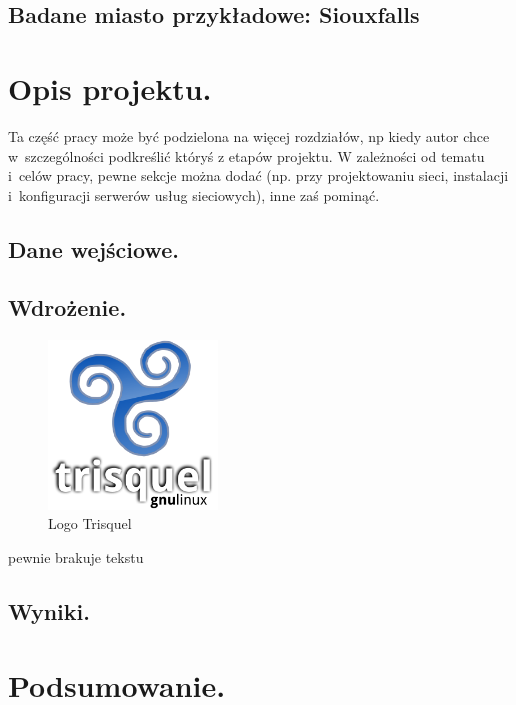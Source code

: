 \documentclass[twoside,12pt]{report}
\let\oldsection\chapter
\def\chapter{\cleardoublepage\oldsection}
\begin{document}
\section{Badane miasto przykładowe: Siouxfalls}


\chapter{Opis projektu.}\label{rozdz.opis} 
Ta część pracy może być podzielona na więcej rozdziałów, np kiedy autor chce
w~szczególności podkreślić któryś z etapów projektu. W zależności od tematu i~celów pracy, pewne sekcje można dodać (np. przy projektowaniu sieci, instalacji
i~konfiguracji serwerów usług sieciowych), inne zaś pominąć.

\section{Dane wejściowe.}





\section{Wdrożenie.}

\begin{figure}[ht]
\includegraphics[width=0.4\textwidth]{img/trisquel}
\caption{Logo Trisquel\cite{trisquel}}
\end{figure}

pewnie brakuje tekstu

\section{Wyniki.}


\chapter{Podsumowanie.}\label{rozdz.podsumowanie} 
\end{document}
